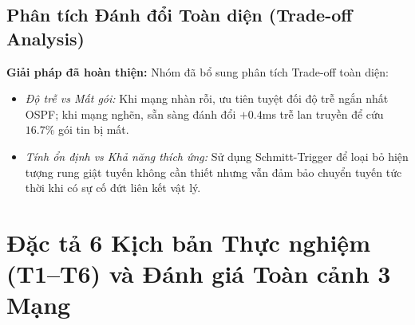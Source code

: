 \documentclass[11pt,a4paper]{article}
\begin{document}
\subsection{Phân tích Đánh đổi Toàn diện (Trade-off Analysis)}
\textbf{Giải pháp đã hoàn thiện:} Nhóm đã bổ sung phân tích Trade-off toàn diện:
\begin{itemize}
    \item \textit{Độ trễ vs Mất gói:} Khi mạng nhàn rỗi, ưu tiên tuyệt đối độ trễ ngắn nhất OSPF; khi mạng nghẽn, sẵn sàng đánh đổi $+0.4$ms trễ lan truyền để cứu $16.7\%$ gói tin bị mất.
    \item \textit{Tính ổn định vs Khả năng thích ứng:} Sử dụng Schmitt-Trigger để loại bỏ hiện tượng rung giật tuyến không cần thiết nhưng vẫn đảm bảo chuyển tuyến tức thời khi có sự cố đứt liên kết vật lý.
\end{itemize}

\vspace{0.4cm}

\section{Đặc tả 6 Kịch bản Thực nghiệm (T1--T6) và Đánh giá Toàn cảnh 3 Mạng}
\end{document}
